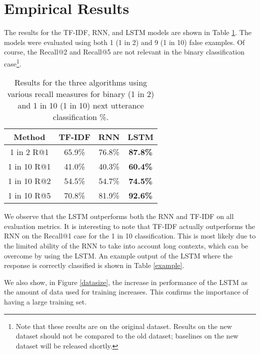 \documentclass[11pt,a4paper]{article}
\begin{document}
\section{Empirical Results}

The results for the TF-IDF, RNN, and LSTM models are shown in Table \ref{results}. The models were evaluated using both 1 (1 in 2) and 9 (1 in 10) false examples.  Of course, the Recall@2 and Recall@5 are not relevant in the binary classification case\footnote{Note that these results are on the original dataset. Results on the new dataset should not be compared to the old dataset; baselines on the new dataset will be released shortly.}.

\begin{table}[!ht]
\centering
\begin{tabular}{|c |c |c|c|} \hline
Method & TF-IDF & RNN & LSTM \\ \hline \hline
1 in 2 R@1 & 65.9\% & 76.8\% & \textbf{87.8\%} \\ \hline 
1 in 10 R@1 & 41.0\% & 40.3\% & \textbf{60.4\%} \\ \hline
1 in 10 R@2 & 54.5\% & 54.7\% & \textbf{74.5\%} \\ \hline 
1 in 10 R@5 & 70.8\% & 81.9\% & \textbf{92.6\%} \\ \hline
\end{tabular}
\caption{\label{results}Results for the three algorithms using various recall measures for binary (1 in 2) and 1 in 10 (1 in 10) next utterance classification \%.}
\end{table}

We observe that the LSTM outperforms both the RNN and TF-IDF on all evaluation metrics. It is interesting to note that TF-IDF actually outperforms the RNN on the Recall@1 case for the 1 in 10 classification. This is most likely due to the limited ability of the RNN to take into account long contexts, which can be overcome by using the LSTM. An example output of the LSTM where the response is correctly classified is shown in Table \ref{example}.


We also show, in Figure \ref{datasize}, the increase in performance of the LSTM as the amount of data used for training increases. This confirms the importance of having a large training set.
\end{document}
